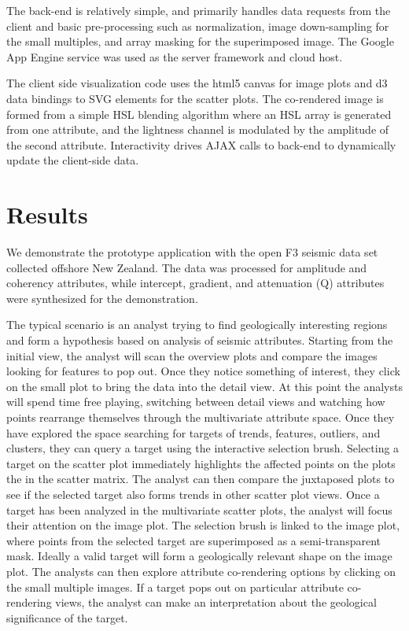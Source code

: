 \documentclass[journal]{vgtc}                %
\begin{document}
The back-end is relatively simple, and primarily handles data requests from the client and
basic pre-processing such as normalization, image down-sampling for the small multiples, and array masking
for the superimposed image. The Google App Engine service was used as the server framework and cloud host.

The client side visualization code uses the html5 canvas for image plots and 
d3 data bindings to SVG elements for the scatter plots. The co-rendered image is formed from
a simple HSL blending algorithm where an HSL array is generated from one attribute,
and the lightness channel is modulated by the amplitude of the second attribute. Interactivity
drives AJAX calls to back-end to dynamically update the client-side data.

\section{Results}
We demonstrate the prototype application with the open F3 seismic data set collected offshore New
Zealand. The data was processed for amplitude and coherency attributes, while intercept,
gradient, and attenuation (Q) attributes were synthesized for the demonstration.

The typical scenario is an analyst trying to find geologically interesting regions and form
a hypothesis based on analysis of seismic attributes. Starting from
the initial view, the analyst will scan the overview plots and compare the images looking
for features to pop out. Once they notice something of interest, they click on the
small plot to bring the data into the detail view. At this point the analysts will spend
time free playing, switching between detail views and watching how points rearrange
themselves through the multivariate attribute space. Once they have explored the space
searching for targets of trends, features, outliers, and clusters, they can query a target
using the interactive selection brush. Selecting a target on the scatter plot immediately highlights
the affected points on the plots the in the scatter matrix. The analyst can then compare
the juxtaposed plots to see if the selected target also forms trends in other scatter plot
views. Once a target has been analyzed in the multivariate scatter plots, the analyst
will focus their attention on the image plot. The selection brush is linked to the
image plot, where points from the selected target are superimposed as a semi-transparent
mask. Ideally a valid target will form a geologically relevant shape on the image plot.
The analysts can then explore attribute co-rendering options by clicking on the small multiple
images. If a target pops out on particular attribute co-rendering views, the analyst
can make an interpretation about the geological significance of the target.
\end{document}
